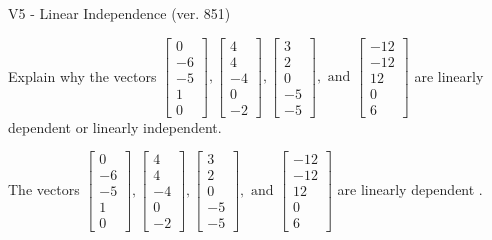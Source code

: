 \begin{exercise}
  \begin{exerciseTitle}V5 - Linear Independence (ver. 851)\end{exerciseTitle}
  \begin{exerciseStatement}
    Explain why the vectors \(\left[\begin{array}{r}
0 \\
-6 \\
-5 \\
1 \\
0
\end{array}\right] , \left[\begin{array}{r}
4 \\
4 \\
-4 \\
0 \\
-2
\end{array}\right] , \left[\begin{array}{r}
3 \\
2 \\
0 \\
-5 \\
-5
\end{array}\right] , \text{ and } \left[\begin{array}{r}
-12 \\
-12 \\
12 \\
0 \\
6
\end{array}\right]\) are linearly dependent or linearly independent.	


  \end{exerciseStatement}
  \begin{exerciseAnswer}
   The vectors \(\left[\begin{array}{r}
0 \\
-6 \\
-5 \\
1 \\
0
\end{array}\right] , \left[\begin{array}{r}
4 \\
4 \\
-4 \\
0 \\
-2
\end{array}\right] , \left[\begin{array}{r}
3 \\
2 \\
0 \\
-5 \\
-5
\end{array}\right] , \text{ and } \left[\begin{array}{r}
-12 \\
-12 \\
12 \\
0 \\
6
\end{array}\right]\) are 
  	 linearly dependent  .
  


  \end{exerciseAnswer}
\end{exercise}